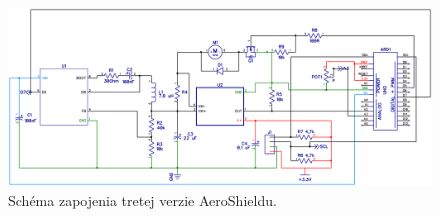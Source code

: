 \begin{figure}[!tbh]
		\centering
	\includegraphics[width=\textwidth]{obr/TretiaSchema.png}
	\caption{Schéma zapojenia tretej verzie AeroShieldu.}\label{OBRAZOK 2.9}
\end{figure}
